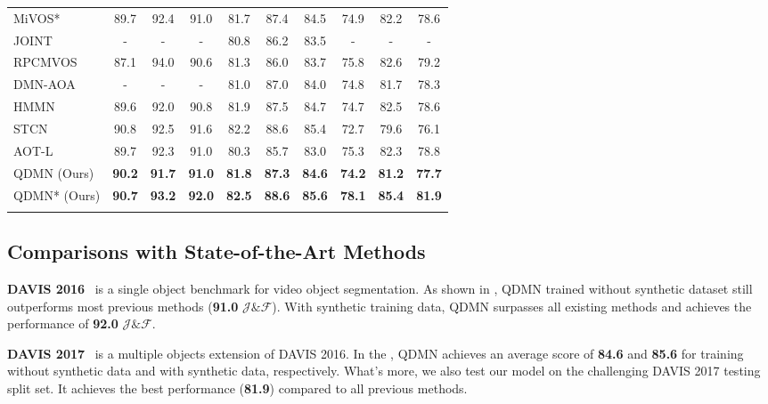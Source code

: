 \documentclass[runningheads]{llncs}
\begin{document}
\begin{table*}[t]
\begin{tabular}{lccccccccc}
			MiVOS*~\cite{mivos}  & {89.7}  & {92.4} & {91.0} & {81.7} & {87.4} & {84.5} & {74.9} & {82.2} & {78.6}\\
			JOINT~\cite{joint}   &- &- &-  & 80.8 & 86.2  & 83.5   &- &- &-  \\
			RPCMVOS~\cite{aaai} &87.1 &94.0 &90.6 &81.3 &86.0 & 83.7 &75.8 &82.6 &79.2\\
			DMN-AOA~\cite{alignment}     &- &- &- & 81.0   & 87.0 & 84.0  &74.8 &81.7 &78.3  \\
			HMMN~\cite{hmm}       &89.6 &92.0 &90.8 &81.9 &87.5 &84.7  & 74.7  & 82.5  & 78.6  \\
			STCN~\cite{stcn}    & 90.8 & 92.5 & 91.6 & 82.2 & 88.6 & 85.4 & 72.7 & 79.6 & 76.1\\
			AOT-L~\cite{aot}  & 89.7  & 92.3 & 91.0 & 80.3   & 85.7 & 83.0 & 75.3   & 82.3 & 78.8\\
			\midrule
			QDMN (Ours)  & \textbf{90.2}  & \textbf{91.7} & \textbf{91.0} & \textbf{81.8}  & \textbf{87.3} & \textbf{84.6} & \textbf{74.2}  & \textbf{81.2}  & \textbf{77.7}\\
			QDMN* (Ours)           & \textbf{90.7}  & \textbf{93.2} & \textbf{92.0} & \textbf{82.5}  & \textbf{88.6} & \textbf{85.6} & \textbf{78.1}  & \textbf{85.4}  & \textbf{81.9}\\
			\bottomrule[1.5pt]
		 \vspace{-25pt}
		\end{tabular}
		
	\end{table*}
	
	
%
 \subsection{Comparisons with State-of-the-Art Methods}

    \noindent\textbf{DAVIS 2016}~\cite{davis16} is a single object benchmark for video object segmentation. As shown in , QDMN trained without synthetic dataset still outperforms most previous methods (\textbf{91.0} $\mathcal{J\&F}$).
    With synthetic training data, QDMN surpasses all existing methods and achieves the performance of \textbf{92.0} $\mathcal{J\&F}$.
    

    
    \noindent\textbf{DAVIS 2017}~\cite{davis17} is a multiple objects extension of DAVIS 2016. In the , QDMN achieves an average score of \textbf{84.6} and \textbf{85.6} for training without synthetic data and with synthetic data, respectively. What's more, we also test our model on the challenging DAVIS 2017 testing split set. It achieves the best performance (\textbf{81.9}) compared to all previous methods.
    
\end{document}
